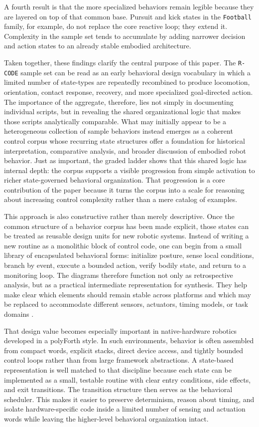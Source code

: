 \documentclass[11pt]{article}
\begin{document}
A fourth result is that the more specialized behaviors remain legible
because they are layered on top of that common base. Pursuit and kick
states in the \texttt{Football} family, for example, do not replace the
core reactive loop; they extend it. Complexity in the sample set tends
to accumulate by adding narrower decision and action states to an
already stable embodied architecture.

Taken together, these findings clarify the central purpose of this
paper. The \texttt{R-CODE} sample set can be read as an early
behavioral design vocabulary in which a limited number of state-types
are repeatedly recombined to produce locomotion, orientation, contact
response, recovery, and more specialized goal-directed action. The
importance of the aggregate, therefore, lies not simply in documenting
individual scripts, but in revealing the shared organizational logic
that makes those scripts analytically comparable. What may initially
appear to be a heterogeneous collection of sample behaviors instead
emerges as a coherent control corpus whose recurring state structures
offer a foundation for historical interpretation, comparative
analysis, and broader discussion of embodied robot behavior. Just as
important, the graded ladder shows that this shared logic has internal
depth: the corpus supports a visible progression from simple activation
to richer state-governed behavioral organization. That progression is a
core contribution of the paper because it turns the corpus into a scale
for reasoning about increasing control complexity rather than a mere
catalog of examples.

This approach is also constructive rather than merely descriptive.
Once the common structure of a behavior corpus has been made explicit,
those states can be treated as reusable design units for new robotic
systems. Instead of writing a new routine as a monolithic block of
control code, one can begin from a small library of encapsulated
behavioral forms: initialize posture, sense local conditions, branch by
event, execute a bounded action, verify bodily state, and return to a
monitoring loop. The diagrams therefore function not only as
retrospective analysis, but as a practical intermediate representation
for synthesis. They help make clear which elements should remain stable
across platforms and which may be replaced to accommodate different
sensors, actuators, timing models, or task domains \cite{arkin1998behavior}.

That design value becomes especially important in native-hardware
robotics developed in a polyForth style. In such environments,
behavior is often assembled from compact words, explicit stacks, direct
device access, and tightly bounded control loops rather than from large
framework abstractions. A state-based representation is well matched to
that discipline because each state can be implemented as a small,
testable routine with clear entry conditions, side effects, and exit
transitions. The transition structure then serves as the behavioral
scheduler. This makes it easier to preserve determinism, reason about
timing, and isolate hardware-specific code inside a limited number of
sensing and actuation words while leaving the higher-level behavioral
organization intact.
\end{document}
